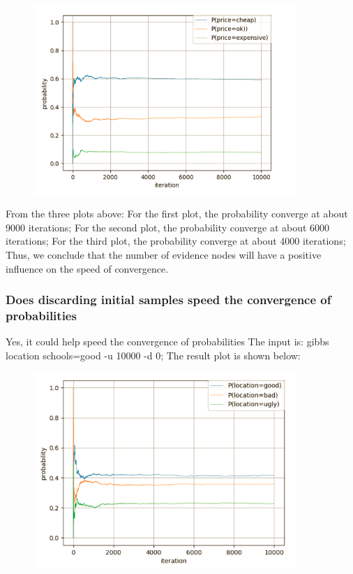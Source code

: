 \documentclass[11pt, a4paper]{article}
\begin{document}
\begin{figure}[htbp]
	
	\centering 
	\includegraphics[width=10cm]{gs_13}
	
	\label{fig:gb13}
	
\end{figure}


From the three plots above:
For the first plot, the probability converge at about 9000 iterations;
For the second plot, the probability converge at about 6000 iterations;
For the third plot, the probability converge at about 4000 iterations;
Thus, we conclude that the number of evidence nodes will have a positive influence on the speed of convergence.

\subsubsection{Does discarding initial samples speed the convergence of probabilities}

Yes, it could help speed the convergence of probabilities
The input is: gibbs location schools=good -u 10000 -d 0; The result plot is shown below: 

\begin{figure}[htbp]
	
	\centering 
	\includegraphics[width=10cm]{gs_14}
	
	\label{fig:gb14}
	
\end{figure}
\end{document}
